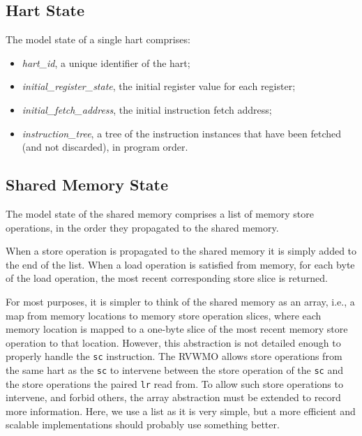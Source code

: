 \subsection{Hart State}
The model state of a single hart comprises:
\begin{itemize}
\item {\it hart\_id}, a unique identifier of the hart;
\item {\it initial\_register\_state}, the initial register value for each register;
\item {\it initial\_fetch\_address}, the initial instruction fetch address;
\item {\it instruction\_tree}, a tree of the instruction instances that have been fetched (and not discarded), in program order.
\end{itemize}


\subsection{Shared Memory State}
The model state of the shared memory comprises a list of memory store operations, in the order they propagated to the shared memory.

When a store operation is propagated to the shared memory it is simply added to the end of the list.
When a load operation is satisfied from memory, for each byte of the load operation, the most recent corresponding store slice is returned.

\begin{commentary}
For most purposes, it is simpler to think of the shared memory as an array, i.e., a map from memory locations to memory store operation slices, where each memory location is mapped to a one-byte slice of the most recent memory store operation to that location.
However, this abstraction is not detailed enough to properly handle the {\tt sc} instruction.
The RVWMO  allows store operations from the same hart as the {\tt sc} to intervene between the store operation of the {\tt sc} and the store operations the paired {\tt lr} read from.
To allow such store operations to intervene, and forbid others, the array abstraction must be extended to record more information.
Here, we use a list as it is very simple, but a more efficient and scalable implementations should probably use something better.
\end{commentary}


